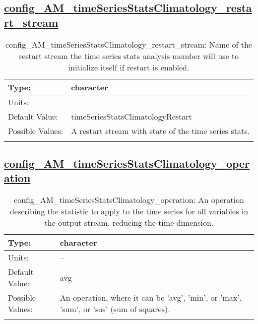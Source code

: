 \subsection[config\_AM\_timeSeriesStatsClimatology\_restart\_stream]{\hyperref[sec:nm_tab_AM_timeSeriesStatsClimatology]{config\_AM\_timeSeriesStatsClimatology\_restart\_stream}}
\label{subsec:nm_sec_config_AM_timeSeriesStatsClimatology_restart_stream}
\begin{center}
\begin{longtable}{| p{2.0in} || p{4.0in} |}
    \hline
    Type: & character \\
    \hline
    Units: & -- \\
    \hline
    Default Value: & timeSeriesStatsClimatologyRestart \\
    \hline
    Possible Values: & A restart stream with state of the time series stats. \\
    \hline
    \caption{config\_AM\_timeSeriesStatsClimatology\_restart\_stream: Name of the restart stream the time series stats analysis member will use to initialize itself if restart is enabled.}
\end{longtable}
\end{center}
\subsection[config\_AM\_timeSeriesStatsClimatology\_operation]{\hyperref[sec:nm_tab_AM_timeSeriesStatsClimatology]{config\_AM\_timeSeriesStatsClimatology\_operation}}
\label{subsec:nm_sec_config_AM_timeSeriesStatsClimatology_operation}
\begin{center}
\begin{longtable}{| p{2.0in} || p{4.0in} |}
    \hline
    Type: & character \\
    \hline
    Units: & -- \\
    \hline
    Default Value: & avg \\
    \hline
    Possible Values: & An operation, where it can be 'avg', 'min', or 'max', 'sum', or 'sos' (sum of squares). \\
    \hline
    \caption{config\_AM\_timeSeriesStatsClimatology\_operation: An operation describing the statistic to apply to the time series for all variables in the output stream, reducing the time dimension.}
\end{longtable}
\end{center}
